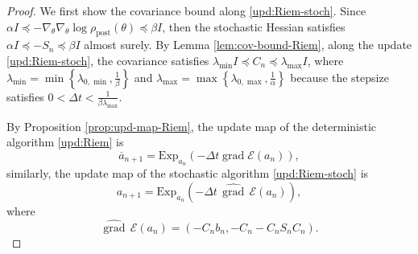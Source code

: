 \documentclass[11pt]{article}
\theoremstyle{plain}
\theoremstyle{definition}
\theoremstyle{remark}
\newcommand{\grad}{\operatorname{grad}}
\begin{document}
\begin{proof}
    We first show the covariance bound along \eqref{upd:Riem-stoch}. Since $\alpha I \preceq -\nabla_\theta \nabla_\theta \log \rho_\mathrm{post} (\theta) \preceq \beta I$, then the stochastic Hessian satisfies $\alpha I \preceq -S_n \preceq \beta I$ almost surely. By Lemma \ref{lem:cov-bound-Riem}, along the update \eqref{upd:Riem-stoch}, the covariance satisfies $\lambda_{\min} I \preceq C_n \preceq \lambda_{\max} I$, where $\lambda_{\min} = \min \left\{ \lambda_{0, \min}, \frac{1}{\beta} \right\}$ and $\lambda_{\max} = \max \left\{ \lambda_{0, \max}, \frac{1}{\alpha} \right\}$ because the stepsize satisfies $0 < \Delta t < \frac{1}{\beta \lambda_{\max}}$.
    
    By Proposition \ref{prop:upd-map-Riem}, the update map of the deterministic algorithm \eqref{upd:Riem} is 
    \begin{equation*}
        \overline a_{n+1} = \mathrm{Exp}_{a_n} \left( -\Delta t \grad \mathcal{E} (a_n) \right),
    \end{equation*}
    similarly, the update map of the stochastic algorithm \eqref{upd:Riem-stoch} is 
    \begin{equation*}
        a_{n+1} = \mathrm{Exp}_{a_n} \left( -\Delta t\, \widehat{\grad}\, \mathcal{E} (a_n) \right),
    \end{equation*}
    where 
    \begin{equation*}
        \widehat{\grad}\, \mathcal{E} (a_n) = \left( - C_n b_n, - C_n - C_n S_n C_n \right).
    \end{equation*}


\end{proof}
\end{document}

